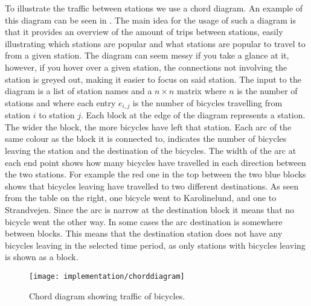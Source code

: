 To illustrate the traffic between stations we use a chord diagram. 
An example of this diagram can be seen in .
The main idea for the usage of such a diagram is that it provides an overview of the amount of trips between stations, easily illustrating which stations are popular and what stations are popular to travel to from a given station.
The diagram can seem messy if you take a glance at it, however, if you hover over a given station, the connections not involving the station is greyed out, making it easier to focus on said station.
The input to the diagram is a list of station names and a $n \times n$ matrix where $n$ is the number of stations and where each entry $e_{i,j}$ is the number of bicycles travelling from station $i$ to station $j$. 
Each block at the edge of the diagram represents a station. 
The wider the block, the more bicycles have left that station. 
Each arc of the same colour as the block it is connected to, indicates the number of bicycles leaving the station and the destination of the bicycles. 
The width of the arc at each end point shows how many bicycles have travelled in each direction between the two stations. 
For example the red one in the top between the two blue blocks shows that bicycles leaving have travelled to two different destinations. 
As seen from the table on the right, one bicycle went to Karolinelund, and one to Strandvejen. 
Since the arc is narrow at the destination block it means that no bicycle went the other way. 
In some cases the arc destination is somewhere between blocks. 
This means that the destination station does not have any bicycles leaving in the selected time period, as only stations with bicycles leaving is shown as a block.

\begin{figure}[h]
\texttt{[image: implementation/chorddiagram]}
\caption{Chord diagram showing traffic of bicycles.}\label{fig:chorddiagram}
\end{figure}

